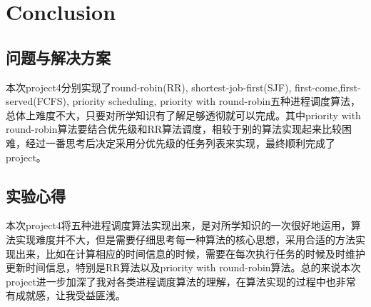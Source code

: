 \documentclass{article}
\begin{document}
\section{Conclusion}

\subsection{问题与解决方案}
本次project4分别实现了round-robin(RR), shortest-job-first(SJF), first-come,first-served(FCFS), priority scheduling, priority with round-robin五种进程调度算法，总体上难度不大，只要对所学知识有了解足够透彻就可以完成。其中priority with round-robin算法要结合优先级和RR算法调度，相较于别的算法实现起来比较困难，经过一番思考后决定采用分优先级的任务列表来实现，最终顺利完成了project。

\subsection{实验心得}
本次project4将五种进程调度算法实现出来，是对所学知识的一次很好地运用，算法实现难度并不大，但是需要仔细思考每一种算法的核心思想，采用合适的方法实现出来，比如在计算相应的时间信息的时候，需要在每次执行任务的时候及时维护更新时间信息，特别是RR算法以及priority with round-robin算法。总的来说本次project进一步加深了我对各类进程调度算法的理解，在算法实现的过程中也非常有成就感，让我受益匪浅。




\end{document}
